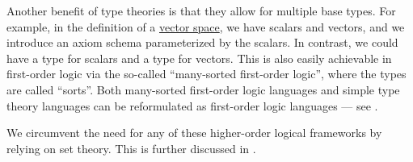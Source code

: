 \begin{remark}
  Another benefit of type theories is that they allow for multiple base types. For example, in the definition of a \hyperref[def:vector_space]{vector space}, we have scalars and vectors, and we introduce an axiom schema parameterized by the scalars. In contrast, we could have a type for scalars and a type for vectors. This is also easily achievable in first-order logic via the so-called \enquote{many-sorted first-order logic}, where the types are called \enquote{sorts}. Both many-sorted first-order logic languages and simple type theory languages can be reformulated as first-order logic languages --- see \cite[ch. 8]{Farmer2008}.

  We circumvent the need for any of these higher-order logical frameworks by relying on set theory. This is further discussed in .
\end{remark}
